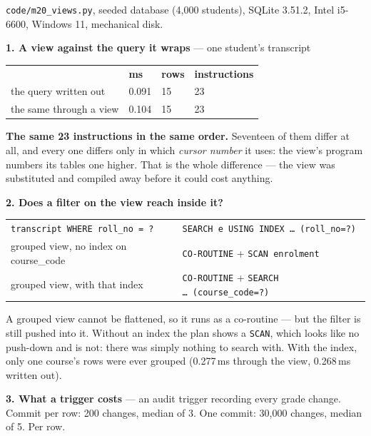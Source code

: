 \begin{measured}
\textsf{\footnotesize \texttt{code/m20\_views.py}, seeded database (4{,}000
students), SQLite 3.51.2, Intel i5-6600, Windows 11, mechanical disk.}

\medskip
\textbf{1. A view against the query it wraps} --- one student's transcript

\begin{tabular}{@{}L{6.4cm}R{2.0cm}R{1.6cm}R{2.6cm}@{}}
& \textbf{ms} & \textbf{rows} & \textbf{instructions} \\
the query written out & 0.091 & 15 & 23 \\
the same through a view & 0.104 & 15 & 23 \\
\end{tabular}

\smallskip
\textbf{The same 23 instructions in the same order.} Seventeen of them differ
at all, and every one differs only in which \emph{cursor number} it uses: the
view's program numbers its tables one higher. That is the whole difference ---
the view was substituted and compiled away before it could cost anything.

\medskip
\textbf{2. Does a filter on the view reach inside it?}

\begin{tabular}{@{}L{7.0cm}L{7.0cm}@{}}
\texttt{transcript WHERE roll\_no = ?} &
  \texttt{SEARCH e USING INDEX \dots\ (roll\_no=?)} \\
grouped view, no index on course\_code &
  \texttt{CO-ROUTINE} + \texttt{SCAN enrolment} \\
grouped view, with that index &
  \texttt{CO-ROUTINE} + \texttt{SEARCH \dots\ (course\_code=?)} \\
\end{tabular}

\smallskip
A grouped view cannot be flattened, so it runs as a co-routine --- but the
filter is still pushed into it. Without an index the plan shows a
\texttt{SCAN}, which looks like no push-down and is not: there was simply
nothing to search with. With the index, only one course's rows were ever
grouped (0.277\,ms through the view, 0.268\,ms written out).

\medskip
\textbf{3. What a trigger costs} --- an audit trigger recording every grade
change. Commit per row: 200 changes, median of 3. One commit: 30{,}000
changes, median of 5. Per row.


\end{measured}
